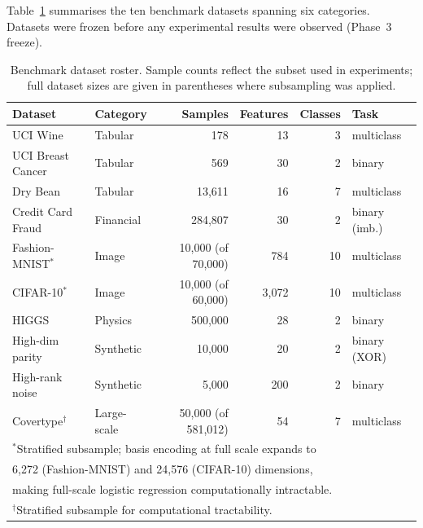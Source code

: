 Table~\ref{tab:datasets} summarises the ten benchmark datasets spanning six
categories.
Datasets were frozen before any experimental results were observed
(Phase~3 freeze).

\begin{table}[tbp]
\centering
\caption{Benchmark dataset roster.  Sample counts reflect the subset used in
experiments; full dataset sizes are given in parentheses where subsampling
was applied.}
\label{tab:datasets}
\small
\begin{tabular}{llrrrl}
\toprule
Dataset & Category & Samples & Features & Classes & Task \\
\midrule
UCI Wine           & Tabular     & 178                     & 13      & 3  & multiclass \\
UCI Breast Cancer  & Tabular     & 569                     & 30      & 2  & binary \\
Dry Bean           & Tabular     & 13{,}611                & 16      & 7  & multiclass \\
Credit Card Fraud  & Financial   & 284{,}807               & 30      & 2  & binary (imb.) \\
Fashion-MNIST$^*$ & Image       & 10{,}000 (of 70{,}000)  & 784     & 10 & multiclass \\
CIFAR-10$^*$      & Image       & 10{,}000 (of 60{,}000)  & 3{,}072 & 10 & multiclass \\
HIGGS              & Physics     & 500{,}000               & 28      & 2  & binary \\
High-dim parity    & Synthetic   & 10{,}000                & 20      & 2  & binary (XOR) \\
High-rank noise    & Synthetic   & 5{,}000                 & 200     & 2  & binary \\
Covertype$^\dagger$ & Large-scale & 50{,}000 (of 581{,}012) & 54    & 7  & multiclass \\
\bottomrule
\multicolumn{6}{l}{\small$^*$Stratified subsample; basis encoding at full scale expands to} \\
\multicolumn{6}{l}{\small\phantom{$^*$}6{,}272 (Fashion-MNIST) and 24{,}576 (CIFAR-10) dimensions,} \\
\multicolumn{6}{l}{\small\phantom{$^*$}making full-scale logistic regression computationally intractable.} \\
\multicolumn{6}{l}{\small$^\dagger$Stratified subsample for computational tractability.} \\
\end{tabular}
\end{table}

